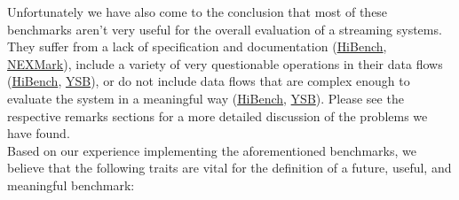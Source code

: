 Unfortunately we have also come to the conclusion that most of these benchmarks aren't very useful for the overall evaluation of a streaming systems. They suffer from a lack of specification and documentation (\hyperref[section:hibench-remarks]{HiBench}, \hyperref[section:nexmark-remarks]{NEXMark}), include a variety of very questionable operations in their data flows (\hyperref[section:hibench-remarks]{HiBench}, \hyperref[section:ysb-remarks]{YSB}), or do not include data flows that are complex enough to evaluate the system in a meaningful way (\hyperref[section:hibench-remarks]{HiBench}, \hyperref[section:ysb-remarks]{YSB}). Please see the respective remarks sections for a more detailed discussion of the problems we have found. \\

Based on our experience implementing the aforementioned benchmarks, we believe that the following traits are vital for the definition of a future, useful, and meaningful benchmark:

